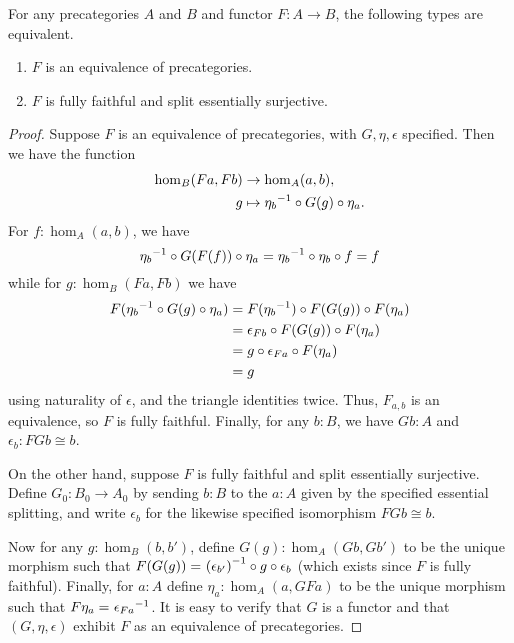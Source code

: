 \begin{lem}\label{ct:ffeso}
  For any precategories $A$ and $B$ and functor $F:A\to B$, the following types are equivalent.
  \begin{enumerate}
  \item $F$ is an equivalence of precategories.\label{item:ct:ffeso1}
  \item $F$ is fully faithful and split essentially surjective.\label{item:ct:ffeso2}
  \end{enumerate}
\end{lem}
\begin{proof}
  Suppose $F$ is an equivalence of precategories, with $G,\eta,\epsilon$ specified.
  Then we have the function
  \begin{align*}
      \hom_B(Fa,Fb) &\to \hom_A(a,b),\\
      g &\mapsto {\eta_b}^{-1}\circ G(g)\circ \eta_a.
  \end{align*}
  For $f:\hom_A(a,b)$, we have
  \[ {\eta_{b}}^{-1}\circ G(F(f))\circ \eta_{a}  =
  {\eta_{b}}^{-1} \circ \eta_{b} \circ f=
  f
  \]
  while for $g:\hom_B(Fa,Fb)$ we have
  \begin{align*}
    F({\eta_b}^{-1} \circ G(g)\circ\eta_a)
    &= F({\eta_b}^{-1})\circ F(G(g))\circ F(\eta_a)\\
    &= \epsilon_{Fb}\circ F(G(g))\circ F(\eta_a)\\
    &= g\circ\epsilon_{Fa}\circ F(\eta_a)\\
    &= g
  \end{align*}
  using naturality of $\epsilon$, and the triangle identities twice.
  Thus, $F_{a,b}$ is an equivalence, so $F$ is fully faithful.
  Finally, for any $b:B$, we have $Gb:A$ and $\epsilon_b:FGb\cong b$.

  On the other hand, suppose $F$ is fully faithful and split essentially surjective.
  Define $G_0:B_0\to A_0$ by sending $b:B$ to the $a:A$ given by the specified essential splitting, and write $\epsilon_b$ for the likewise specified isomorphism $FGb\cong b$.

  Now for any $g:\hom_B(b,b')$, define $G(g):\hom_A(Gb,Gb')$ to be the unique morphism such that $F(G(g)) =_{} {(\epsilon_{b'})}^{-1}\circ g \circ \epsilon_b $ (which exists since $F$ is fully faithful).
  Finally, for $a:A$ define $\eta_a:\hom_A(a,GFa)$ to be the unique morphism such that $F\eta_a =_{} {\epsilon_{Fa}}^{-1}$.
  It is easy to verify that $G$ is a functor and that $(G,\eta,\epsilon)$ exhibit $F$ as an equivalence of precategories.


\end{proof}

